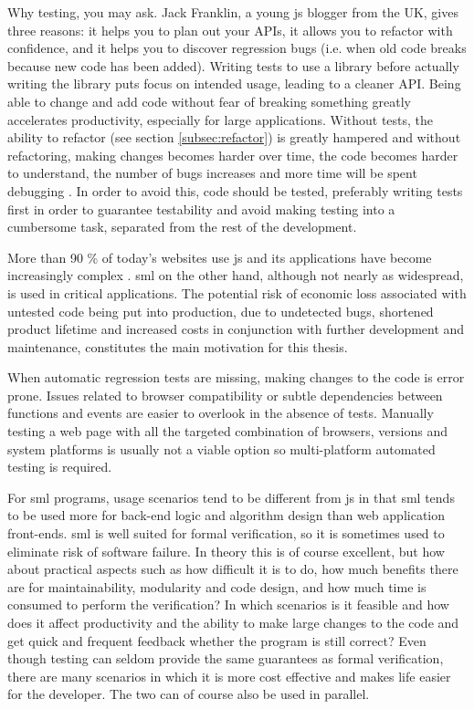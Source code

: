 \documentclass[11pt]{article}
\begin{document}
Why testing, you may ask. Jack Franklin, a young \gls{js} blogger from the UK, gives three reasons: it helps you to plan out your APIs, it allows you to refactor with confidence, and it helps you to discover regression bugs (i.e. when old code breaks because new code has been added). Writing tests to use a library before actually writing the library puts focus on intended usage, leading to a cleaner API. Being able to change and add code without fear of breaking something greatly accelerates productivity, especially for large applications. \cite{JackFranklin} Without tests, the ability to refactor (see section \ref{subsec:refactor}) is greatly hampered and without refactoring, making changes becomes harder over time, the code becomes harder to understand, the number of bugs increases and more time will be spent debugging \cite[p.~47-49]{Refactoring}. In order to avoid this, code should be tested, preferably writing tests first in order to guarantee testability and avoid making testing into a cumbersome task, separated from the rest of the development.

More than 90 \% of today's websites use \gls{js} \cite{BusinessJavascript} and its applications have become increasingly complex \cite[question~23]{Ekelof}. \gls{sml} on the other hand, although not nearly as widespread, is used in critical applications. The potential risk of economic loss associated with untested code being put into production, due to undetected bugs, shortened product lifetime and increased costs in conjunction with further development and maintenance, constitutes the main motivation for this thesis.

When automatic regression tests are missing, making changes to the code is error prone. Issues related to browser compatibility or subtle dependencies between functions and events are easier to overlook in the absence of tests. Manually testing a web page with all the targeted combination of browsers, versions and system platforms is usually not a viable option \cite{TestSwarm} so multi-platform automated testing is required. %

For \gls{sml} programs, usage scenarios tend to be different from \gls{js} in that \gls{sml} tends to be used more for back-end logic and algorithm design than web application front-ends. \gls{sml} is well suited for formal verification, so it is sometimes used to eliminate risk of software failure. In theory this is of course excellent, but how about practical aspects such as how difficult it is to do, how much benefits there are for maintainability, modularity and code design, and how much time is consumed to perform the verification? In which scenarios is it feasible and how does it affect productivity and the ability to make large changes to the code and get quick and frequent feedback whether the program is still correct? Even though testing can seldom provide the same guarantees as formal verification, there are many scenarios in which it is more cost effective and makes life easier for the developer. The two can of course also be used in parallel.
\end{document}
